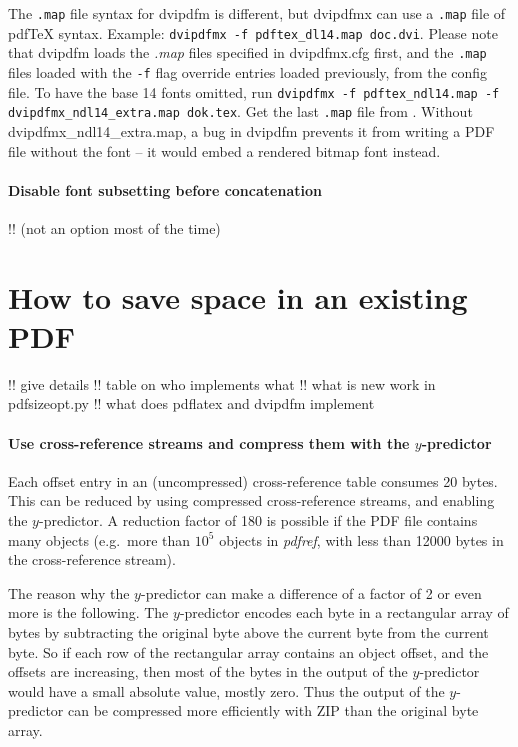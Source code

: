 \documentclass{ltugproc}
\def\cmd{\textsf}
\def\pkg{\textsf}
\begin{document}
The \texttt{.map} file syntax for \cmd{dvipdfm} is different, but
\cmd{dvipdfmx} can use a \texttt{.map} file of pdf\TeX{} syntax. Example:
\texttt{dvipdfmx -f pdftex\_dl14.map doc.dvi}. Please note that
\cmd{dvipdfm} loads the \emph{.map} files specified in \pkg{dvipdfmx.cfg}
first, and the \texttt{.map} files loaded with the \texttt{-f} flag override
entries loaded previously, from the config file. To have the base 14 fonts
omitted, run \texttt{dvipdfmx -f pdftex\_ndl14.map -f
dvipdfmx\_ndl14\_extra.map dok.tex}. Get the last \texttt{.map} file from
\cite{pdfsizeopt-extra}. Without \pkg{dvipdfmx\_ndl14\_extra.map}, a bug in
\cmd{dvipdfm} prevents it from writing a PDF file without the font -- it
would embed a rendered bitmap font instead.

\paragraph{Disable font subsetting before concatenation}

!! (not an option most of the time)

\section{How to save space in an existing PDF}\label{existing}

!! give details
!! table on who implements what
!! what is new work in pdfsizeopt.py
!! what does pdflatex and dvipdfm implement

\paragraph{Use cross-reference streams and compress them with the $y$-predictor}

Each offset entry in an (uncompressed) cross-reference table consumes 20
bytes. This can be reduced by using compressed cross-reference streams, and
enabling the $y$-predictor. A reduction factor of 180 is possible if the
PDF file contains many objects (e.g.\ more than $10^5$ objects in
\emph{pdfref}, with less than 12000 bytes in the cross-reference stream).

The reason why the $y$-predictor can make a difference of a factor of 2 or
even more is the following.
The $y$-predictor encodes each byte in a rectangular array of bytes by
subtracting the original byte above the current byte from the current byte.
So if each row of the rectangular array contains an object offset, and the
offsets are increasing, then most of the bytes in the output of the
$y$-predictor would have a small absolute value, mostly zero. Thus the
output of the $y$-predictor can be compressed more efficiently with ZIP than
the original byte array.
\end{document}
